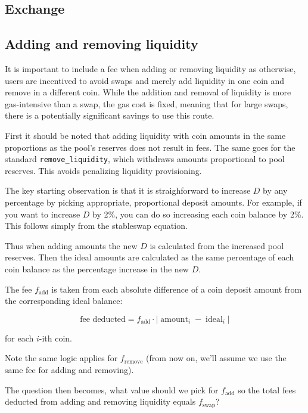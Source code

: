 \documentclass[
]{article}
\begin{document}
\hypertarget{exchange}{%
\subsection{Exchange}\label{exchange}}

\hypertarget{adding-and-removing-liquidity}{%
\subsection{Adding and removing
liquidity}\label{adding-and-removing-liquidity}}

It is important to include a fee when adding or removing liquidity as
otherwise, users are incentived to avoid swaps and merely add liquidity
in one coin and remove in a different coin. While the addition and
removal of liquidity is more gas-intensive than a swap, the gas cost is
fixed, meaning that for large swaps, there is a potentially significant
savings to use this route.

First it should be noted that adding liquidity with coin amounts in the
same proportions as the pool's reserves does not result in fees. The
same goes for the standard \texttt{remove\_liquidity}, which withdraws
amounts proportional to pool reserves. This avoids penalizing liquidity
provisioning.

The key starting observation is that it is straighforward to increase
\(D\) by any percentage by picking appropriate, proportional deposit
amounts. For example, if you want to increase \(D\) by 2\%, you can do
so increasing each coin balance by 2\%. This follows simply from the
stableswap equation.

Thus when adding amounts the new \(D\) is calculated from the increased
pool reserves. Then the ideal amounts are calculated as the same
percentage of each coin balance as the percentage increase in the new
\(D\).

The fee \(f_{\operatorname{add}}\) is taken from each absolute
difference of a coin deposit amount from the corresponding ideal
balance:

\[ \text{fee deducted} = f_{\operatorname{add}} \cdot |\operatorname{amount}_i - \operatorname{ideal}_i| \]

for each \(i\)-ith coin.

Note the same logic applies for \(f_{\operatorname{remove}}\) (from now
on, we'll assume we use the same fee for adding and removing).

The question then becomes, what value should we pick for
\(f_{\operatorname{add}}\) so the total fees deducted from adding and
removing liquidity equals \(f_{\operatorname{swap}}\)?
\end{document}
